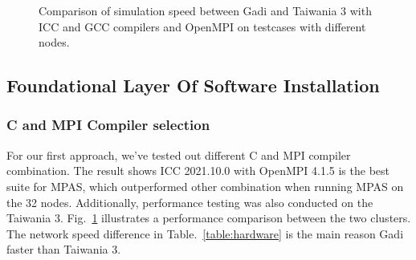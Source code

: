 \begin{figure}[t]
\centering
{}
\caption{Comparison of simulation speed between Gadi and Taiwania 3 with ICC and GCC compilers and OpenMPI on testcases with different nodes.}
\label{fig:compare-compiler}
\end{figure}

\subsection{Foundational Layer Of Software Installation}
\subsubsection{C and MPI Compiler selection}
For our first approach, we've tested out different C and MPI compiler combination. The result shows ICC 2021.10.0 with OpenMPI 4.1.5 is the best suite for MPAS, which outperformed other combination when running MPAS on the 32 nodes. Additionally, performance testing was also conducted on the Taiwania 3. Fig.~\ref{fig:compare-compiler} illustrates a performance comparison between the two clusters. The network speed difference in Table.~\ref{table:hardware} is the main reason Gadi faster than Taiwania 3.

